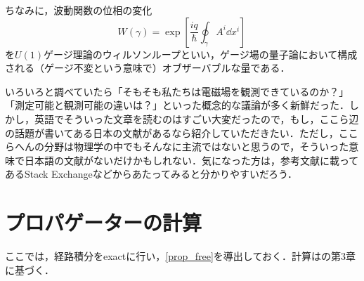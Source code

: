 \documentclass[a4paper,pdflatex,ja=standard]{bxjsarticle}
\renewcommand{\theequation}{\thesection.\arabic{equation}}
\renewcommand{\thefigure}{\thesection.\arabic{figure}}
\renewcommand{\thetable}{\thesection.\arabic{table}}
\begin{document}
\vspace{10pt}
{\small
  ちなみに，波動関数の位相の変化
  \begin{equation}
    W(\gamma)
    =
    \exp\left[ 
      \frac{iq}{\hbar}
      \oint_{\gamma} A^{i}\dd x^i \right]
  \end{equation}
  を$U(1)$ゲージ理論のウィルソンループといい，ゲージ場の量子論において構成される（ゲージ不変という意味で）オブザーバブルな量である．
}

\vspace{10pt}
{\small
  いろいろと調べていたら「そもそも私たちは電磁場を観測できているのか？」「測定可能と観測可能の違いは？」といった概念的な議論が多く新鮮だった．しかし，英語でそういった文章を読むのはすごい大変だったので，もし，ここら辺の話題が書いてある日本の文献があるなら紹介していただきたい．ただし，ここらへんの分野は物理学の中でもそんなに主流ではないと思うので，そういった意味で日本語の文献がないだけかもしれない．気になった方は，参考文献に載ってあるStack Exchangeなどからあたってみると分かりやすいだろう．
}


\clearpage
\makeatletter
\renewcommand{\appendix}{\par
  \setcounter{section}{0}%
  \setcounter{subsection}{0}%
  \gdef\presectionname{\appendixname}%
  \gdef\postsectionname{}%
  \gdef\thesection{\presectionname\@Alph\c@section\postsectionname}%
  \gdef\thesubsection{\@Alph\c@section.\@arabic\c@subsection}%
  \renewcommand{\theequation}{\@Alph\c@section.\arabic{equation}}%
  \renewcommand{\thefigure}{\@Alph\c@section.\arabic{figure}}%
  \renewcommand{\thetable}{\@Alph\c@section.\arabic{table}}%
}
\makeatother
\appendix

\section{プロパゲーターの計算}
\label{prop}

ここでは，経路積分をexactに行い，\eqref{prop_free}を導出しておく．計算は\cite{Jones}の第3章に基づく．
\end{document}
